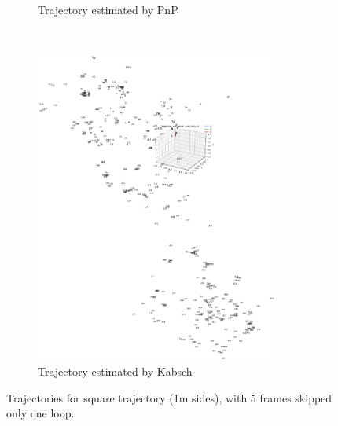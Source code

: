 \documentclass[12pt,a4paper]{article}
\begin{document}
\begin{figure}[p]
\begin{subfigure}[t]{0.5\textwidth}
        \caption{Trajectory estimated by PnP}
      \end{subfigure} %
      ~
      \begin{subfigure}[t]{0.5\textwidth}
        \includegraphics[width=80mm]{../quad/basic-reg-saves-S1b/5/atrj_d.pdf}
        \caption{Trajectory estimated by Kabsch}
      \end{subfigure}
      \caption{Trajectories for square trajectory (1m sides), with 5 frames skipped only one loop.}
      \label{f: quad square trj}
    \end{figure}




\end{document}
